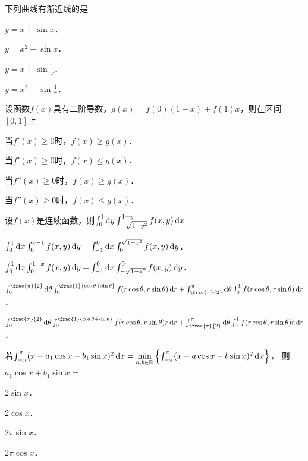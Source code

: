 \documentclass[plain,noanswer,medmath]{../../template/jnuexam}
\begin{document}




\begin{problem}
下列曲线有渐近线的是\pickout{}
\begin{abcd}
\item $y = x + \sin x$．
\item $y = x^2 + \sin x$．
\item $y = x + \sin \frac{1}{x}$．
\item $y = x^2 + \sin \frac{1}{x}$．
\end{abcd}
\end{problem}


\begin{problem}
设函数$f(x)$具有二阶导数，$g(x) = f(0)(1 - x) + f(1)x$，则在区间$[0,1]$上\pickout{}
\begin{abcd}
\item 当$f'(x) \ge 0$时，$f(x) \ge g(x)$．
\item 当$f'(x) \ge 0$时，$f(x) \le g(x)$．
\item 当$f''(x) \ge 0$时，$f(x) \ge g(x)$．
\item 当$f''(x) \ge 0$时，$f(x) \le g(x)$．
\end{abcd}
\end{problem}


\begin{problem}
设$f(x)$是连续函数，则$\int_0^1 \mathop{}\!\mathrm{d} y\int_{- \sqrt{1 - y^2}}^{1 - y} f(x,y)\mathop{}\!\mathrm{d} x =$\pickout{}
\begin{abcd}
\item $\int_0^1 \mathop{}\!\mathrm{d} x\int_0^{x - 1} f(x,y)\mathop{}\!\mathrm{d} y + \int_{-1}^0 \mathop{}\!\mathrm{d} x\int_0^{\sqrt{1 - x^2}} f(x,y)\mathop{}\!\mathrm{d} y$．
\item $\int_0^1 \mathop{}\!\mathrm{d} x\int_0^{1 - x} f(x,y)\mathop{}\!\mathrm{d} y + \int_{-1}^0 \mathop{}\!\mathrm{d} x\int_{- \sqrt{1 - x^2}}^0 f(x,y)\mathop{}\!\mathrm{d} y$．
\item $\int_0^{\frac{\pi}{2}}\d\theta
       \int_0^{\frac{1}{\cos\theta+\sin\theta}}f(r\cos\theta,r\sin\theta)\dr
       + \int_{\frac{\pi}{2}}^{\pi}\d\theta \int_0^1 f(r\cos\theta,r\sin\theta)\dr$．
\item $\int_0^{\frac{\pi}{2}}\d\theta 
       \int_0^{\frac{1}{\cos\theta+\sin\theta}}f(r\cos\theta,r\sin\theta)r\dr
       + \int_{\frac{\pi}{2}}^{\pi}\d\theta \int_0^1 f(r\cos\theta,r\sin\theta)r\dr$．
\end{abcd}
\end{problem}


\begin{problem}
若$\int_{- \pi}^{\pi}(x - a_1\cos x - b_1\sin x)^2 \mathop{}\!\mathrm{d} x
= \min\limits_{a,b \in \mathbb{R}}\left\{\int_{-\pi}^{\pi}(x - a\cos x - b\sin x)^2 \mathop{}\!\mathrm{d} x\right\}$，
\goodbreak 则$a_1\cos x + b_1\sin x =$\pickout{}
\begin{abcd}
\item $2\sin x$．
\item $2\cos x$．
\item $2\pi \sin x$．
\item $2\pi \cos x$．
\end{abcd}
\end{problem}
\end{document}

